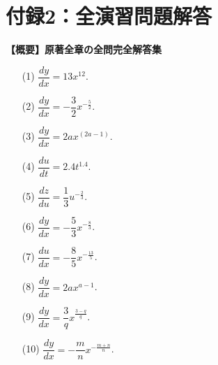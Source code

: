 \documentclass[a4paper,11pt,openany]{ltjsbook}
\begin{document}
\chapter{付録2：全演習問題解答}
\noindent\textbf{\large 【概要】原著全章の全問完全解答集}\\[4mm]
\par\bigskip\noindent{\Large\bfseries [演習 I の解答]}\par\smallskip
\begin{enumerate}
\item[(1)] $\dfrac{dy}{dx} = 13x^{12}$.
\item[(2)] $\dfrac{dy}{dx} = - \dfrac{3}{2} x^{-\frac{5}{2}}$.
\item[(3)] $\dfrac{dy}{dx} = 2ax^{(2a-1)}$.
\item[(4)] $\dfrac{du}{dt} = 2.4t^{1.4}$.
\item[(5)] $\dfrac{dz}{du} = \dfrac{1}{3} u^{-\frac{2}{3}}$.
\item[(6)] $\dfrac{dy}{dx} = -\dfrac{5}{3}x^{-\frac{8}{3}}$.
\item[(7)] $\dfrac{du}{dx} = -\dfrac{8}{5}x^{-\frac{13}{5}}$.
\item[(8)] $\dfrac{dy}{dx} = 2ax^{a-1}$.
\item[(9)] $\dfrac{dy}{dx} = \dfrac{3}{q} x^{\frac{3-q}{q}}$.
\item[(10)] $\dfrac{dy}{dx} = -\dfrac{m}{n} x^{-\frac{m+n}{n}}$.
\par\smallskip
\end{enumerate}
\par\bigskip\noindent{\Large\bfseries [演習 II の解答]}\par\smallskip
\end{document}
